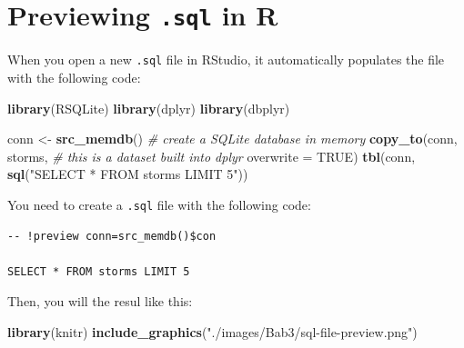 \documentclass[
]{book}
\newenvironment{Shaded}{\begin{snugshade}}{\end{snugshade}}
\newcommand{\AttributeTok}[1]{\textcolor[rgb]{0.13,0.29,0.53}{#1}}
\newcommand{\CommentTok}[1]{\textcolor[rgb]{0.56,0.35,0.01}{\textit{#1}}}
\newcommand{\ConstantTok}[1]{\textcolor[rgb]{0.56,0.35,0.01}{#1}}
\newcommand{\FunctionTok}[1]{\textcolor[rgb]{0.13,0.29,0.53}{\textbf{#1}}}
\newcommand{\NormalTok}[1]{#1}
\newcommand{\OtherTok}[1]{\textcolor[rgb]{0.56,0.35,0.01}{#1}}
\newcommand{\StringTok}[1]{\textcolor[rgb]{0.31,0.60,0.02}{#1}}
\begin{document}
\hypertarget{previewing-.sql-in-r}{%
\section{\texorpdfstring{Previewing \texttt{.sql} in R}{Previewing .sql in R}}\label{previewing-.sql-in-r}}

When you open a new \texttt{.sql} file in RStudio, it automatically populates the file with the following code:

\begin{Shaded}
\begin{Highlighting}[]
\FunctionTok{library}\NormalTok{(RSQLite)}
\FunctionTok{library}\NormalTok{(dplyr)}
\FunctionTok{library}\NormalTok{(dbplyr)}

\NormalTok{conn }\OtherTok{\textless{}{-}} \FunctionTok{src\_memdb}\NormalTok{() }\CommentTok{\# create a SQLite database in memory}
\FunctionTok{copy\_to}\NormalTok{(conn, }
\NormalTok{        storms,     }\CommentTok{\# this is a dataset built into dplyr}
        \AttributeTok{overwrite =} \ConstantTok{TRUE}\NormalTok{)}
\FunctionTok{tbl}\NormalTok{(conn, }\FunctionTok{sql}\NormalTok{(}\StringTok{"SELECT * FROM storms LIMIT 5"}\NormalTok{))}
\end{Highlighting}
\end{Shaded}

You need to create a \texttt{.sql} file with the following code:

\begin{verbatim}
-- !preview conn=src_memdb()$con

SELECT * FROM storms LIMIT 5
\end{verbatim}

Then, you will the resul like this:

\begin{Shaded}
\begin{Highlighting}[]
\FunctionTok{library}\NormalTok{(knitr)}
\FunctionTok{include\_graphics}\NormalTok{(}\StringTok{"./images/Bab3/sql{-}file{-}preview.png"}\NormalTok{)}
\end{Highlighting}
\end{Shaded}
\end{document}
